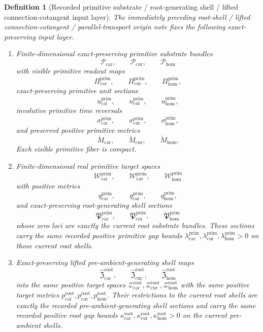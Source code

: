 \documentclass[11pt]{article}
\newcommand{\TensorRootTarget}{\mathcal Z_{\mathrm{car}}^{\mathrm{root}}}
\newcommand{\CurRootTarget}{\mathcal Z_{\mathrm{cur}}^{\mathrm{root}}}
\newcommand{\HomRootTarget}{\mathcal Z_{\mathrm{hom}}^{\mathrm{root}}}
\newcommand{\TensorRootTargetMetric}{p_{\mathrm{car}}^{\mathrm{root}}}
\newcommand{\CurRootTargetMetric}{p_{\mathrm{cur}}^{\mathrm{root}}}
\newcommand{\HomRootTargetMetric}{p_{\mathrm{hom}}^{\mathrm{root}}}
\newcommand{\TensorRootGap}{\kappa_{\mathrm{car}}^{\mathrm{root}}}
\newcommand{\CurRootGap}{\kappa_{\mathrm{cur}}^{\mathrm{root}}}
\newcommand{\HomRootGap}{\kappa_{\mathrm{hom}}^{\mathrm{root}}}
\newcommand{\TensorPrimitiveSpace}{\mathcal P_{\mathrm{car}}}
\newcommand{\CurPrimitiveSpace}{\mathcal P_{\mathrm{cur}}}
\newcommand{\HomPrimitiveSpace}{\mathcal P_{\mathrm{hom}}}
\newcommand{\TensorPrimitiveRead}{\Pi_{\mathrm{car}}^{\mathrm{prim}}}
\newcommand{\CurPrimitiveRead}{\Pi_{\mathrm{cur}}^{\mathrm{prim}}}
\newcommand{\HomPrimitiveRead}{\Pi_{\mathrm{hom}}^{\mathrm{prim}}}
\newcommand{\TensorPrimitiveUnit}{u_{\mathrm{car}}^{\mathrm{prim}}}
\newcommand{\CurPrimitiveUnit}{u_{\mathrm{cur}}^{\mathrm{prim}}}
\newcommand{\HomPrimitiveUnit}{u_{\mathrm{hom}}^{\mathrm{prim}}}
\newcommand{\TensorPrimitiveTimeRev}{\sigma_{\mathrm{car}}^{\mathrm{prim}}}
\newcommand{\CurPrimitiveTimeRev}{\sigma_{\mathrm{cur}}^{\mathrm{prim}}}
\newcommand{\HomPrimitiveTimeRev}{\sigma_{\mathrm{hom}}^{\mathrm{prim}}}
\newcommand{\TensorPrimitiveSpaceMetric}{\breve M_{\mathrm{car}}}
\newcommand{\CurPrimitiveSpaceMetric}{\breve M_{\mathrm{cur}}}
\newcommand{\HomPrimitiveSpaceMetric}{\breve M_{\mathrm{hom}}}
\newcommand{\TensorPrimitiveTarget}{\mathcal W_{\mathrm{car}}^{\mathrm{prim}}}
\newcommand{\CurPrimitiveTarget}{\mathcal W_{\mathrm{cur}}^{\mathrm{prim}}}
\newcommand{\HomPrimitiveTarget}{\mathcal W_{\mathrm{hom}}^{\mathrm{prim}}}
\newcommand{\TensorPrimitiveTargetMetric}{q_{\mathrm{car}}^{\mathrm{prim}}}
\newcommand{\CurPrimitiveTargetMetric}{q_{\mathrm{cur}}^{\mathrm{prim}}}
\newcommand{\HomPrimitiveTargetMetric}{q_{\mathrm{hom}}^{\mathrm{prim}}}
\newcommand{\TensorPrimitiveSection}{\mathfrak P_{\mathrm{car}}^{\mathrm{prim}}}
\newcommand{\CurPrimitiveSection}{\mathfrak P_{\mathrm{cur}}^{\mathrm{prim}}}
\newcommand{\HomPrimitiveSection}{\mathfrak P_{\mathrm{hom}}^{\mathrm{prim}}}
\newcommand{\TensorPrimitiveGap}{\lambda_{\mathrm{car}}^{\mathrm{prim}}}
\newcommand{\CurPrimitiveGap}{\lambda_{\mathrm{cur}}^{\mathrm{prim}}}
\newcommand{\HomPrimitiveGap}{\lambda_{\mathrm{hom}}^{\mathrm{prim}}}
\newcommand{\TensorPrimitiveLiftedPreAmbientSection}{\widehat{\mathfrak Z}_{\mathrm{car}}^{\mathrm{root}}}
\newcommand{\CurPrimitiveLiftedPreAmbientSection}{\widehat{\mathfrak Z}_{\mathrm{cur}}^{\mathrm{root}}}
\newcommand{\HomPrimitiveLiftedPreAmbientSection}{\widehat{\mathfrak Z}_{\mathrm{hom}}^{\mathrm{root}}}
\newtheorem{definition}{Definition}
\begin{document}
\begin{definition}[Recorded primitive substrate / root-generating shell / lifted connection-cotangent input layer]
\label{def:recorded_primitive_layer}
The immediately preceding root-shell / lifted connection-cotangent / parallel-transport origin note fixes the following exact-preserving input layer.
\begin{enumerate}
    \item Finite-dimensional exact-preserving primitive substrate bundles
    \[
    \TensorPrimitiveSpace,\qquad
    \CurPrimitiveSpace,\qquad
    \HomPrimitiveSpace
    \]
    with visible primitive readout maps
    \[
    \TensorPrimitiveRead,\qquad
    \CurPrimitiveRead,\qquad
    \HomPrimitiveRead,
    \]
    exact-preserving primitive unit sections
    \[
    \TensorPrimitiveUnit,\qquad
    \CurPrimitiveUnit,\qquad
    \HomPrimitiveUnit,
    \]
    involutive primitive time reversals
    \[
    \TensorPrimitiveTimeRev,\qquad
    \CurPrimitiveTimeRev,\qquad
    \HomPrimitiveTimeRev,
    \]
    and preserved positive primitive metrics
    \[
    \TensorPrimitiveSpaceMetric,\qquad
    \CurPrimitiveSpaceMetric,\qquad
    \HomPrimitiveSpaceMetric.
    \]
    Each visible primitive fiber is compact.
    \item Finite-dimensional real primitive target spaces
    \[
    \TensorPrimitiveTarget,\qquad
    \CurPrimitiveTarget,\qquad
    \HomPrimitiveTarget
    \]
    with positive metrics
    \[
    \TensorPrimitiveTargetMetric,\qquad
    \CurPrimitiveTargetMetric,\qquad
    \HomPrimitiveTargetMetric,
    \]
    and exact-preserving root-generating shell sections
    \[
    \TensorPrimitiveSection,\qquad
    \CurPrimitiveSection,\qquad
    \HomPrimitiveSection
    \]
    whose zero loci are exactly the current root substrate bundles. These sections carry the same recorded positive primitive gap bounds \(\TensorPrimitiveGap,\CurPrimitiveGap,\HomPrimitiveGap>0\) on those current root shells.
    \item Exact-preserving lifted pre-ambient-generating shell maps
    \[
    \TensorPrimitiveLiftedPreAmbientSection,\qquad
    \CurPrimitiveLiftedPreAmbientSection,\qquad
    \HomPrimitiveLiftedPreAmbientSection
    \]
    into the same positive target spaces \(\TensorRootTarget,\CurRootTarget,\HomRootTarget\) with the same positive target metrics \(\TensorRootTargetMetric,\CurRootTargetMetric,\HomRootTargetMetric\). Their restrictions to the current root shells are exactly the recorded pre-ambient-generating shell sections and carry the same recorded positive root gap bounds \(\TensorRootGap,\CurRootGap,\HomRootGap>0\) on the current pre-ambient shells.

\end{enumerate}
\end{definition}
\end{document}
